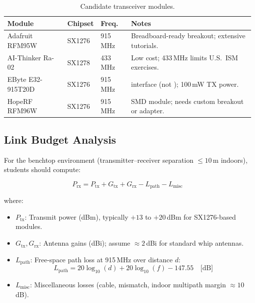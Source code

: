 \documentclass[11pt,letterpaper]{article}
\begin{document}
	\begin{table}[ht!]
		\centering
		\caption{Candidate \RF{} transceiver modules.}
		\label{tab:candidates}
		\renewcommand{\arraystretch}{1.3}
		\begin{tabularx}{\textwidth}{l l l X}
			\toprule
			\textbf{Module} & \textbf{Chipset} & \textbf{Freq.} & \textbf{Notes} \\
			\midrule
			Adafruit RFM95W & SX1276 & 915\,MHz & Breadboard-ready breakout; extensive tutorials. \\
			AI-Thinker Ra-02 & SX1278 & 433\,MHz & Low cost; 433\,MHz limits U.S.\ ISM exercises. \\
			EByte E32-915T20D & SX1276 & 915\,MHz & \UART{} interface (not \SPI{}); 100\,mW TX power. \\
			HopeRF RFM96W & SX1276 & 915\,MHz & SMD module; needs custom breakout or adapter. \\
			\bottomrule
		\end{tabularx}
	\end{table}
	
	\subsection{Link Budget Analysis}
	
	For the benchtop environment (transmitter--receiver separation $\leq 10$\,m indoors), students should compute:
	
	\begin{equation}
		P_{\text{rx}} = P_{\text{tx}} + G_{\text{tx}} + G_{\text{rx}} - L_{\text{path}} - L_{\text{misc}}
		\label{eq:linkbudget}
	\end{equation}
	
	where:
	\begin{itemize}[leftmargin=2em]
		\item $P_{\text{tx}}$: Transmit power (dBm), typically $+13$ to $+20$\,dBm for SX1276-based modules.
		\item $G_{\text{tx}}, G_{\text{rx}}$: Antenna gains (dBi); assume $\approx 2$\,dBi for standard whip antennas.
		\item $L_{\text{path}}$: Free-space path loss at 915\,MHz over distance $d$:
		\begin{equation}
			L_{\text{path}} = 20\log_{10}(d) + 20\log_{10}(f) - 147.55 \quad \text{[dB]}
		\end{equation}
		\item $L_{\text{misc}}$: Miscellaneous losses (cable, mismatch, indoor multipath margin $\approx 10$\,dB).
	\end{itemize}
	
\end{document}
